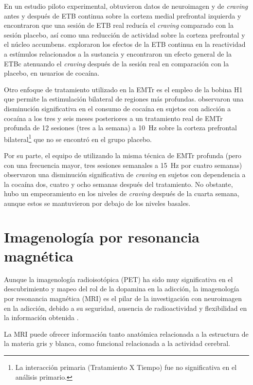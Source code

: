 En un estudio piloto experimental, \textcite{Hanlon2015} obtuvieron datos de neuroimagen y de \textit{craving} antes y después de ETB continua sobre la corteza medial prefrontal izquierda y encontraron que una sesión de ETB real reducía el \textit{craving} comparado con la sesión placebo, así como una reducción de actividad sobre la corteza prefrontal y el núcleo accumbens.
\textcite{Kearney-Ramos2018a} exploraron los efectos de la ETB continua en la reactividad a estímulos relacionados a la sustancia y encontraron un efecto general de la ETBc atenuando el \textit{craving} después de la sesión real en comparación con la placebo, en usuarios de cocaína. \par
Otro enfoque de tratamiento utilizado en la EMTr es el empleo de la bobina H1 que permite la estimulación bilateral de regiones más profundas.
\textcite{Bolloni2016} observaron una disminución significativa en el consumo de cocaína en sujetos con adicción a cocaína a los tres y seis meses posteriores a un tratamiento real de EMTr profunda de 12 sesiones (tres a la semana) a \SI{10}{\hertz} sobre la corteza prefrontal bilateral\footnote{La interacción primaria (Tratamiento X Tiempo) fue no significativa en el análisis primario.} que no se encontró en el grupo placebo.\par
Por su parte, el equipo de \textcite{Rapinesi2016} utilizando la misma técnica de EMTr profunda (pero con una frecuencia mayor, tres sesiones semanales a \SI{15}{\hertz} por cuatro semanas) observaron una disminución significativa de \textit{craving} en sujetos con dependencia a la cocaína dos, cuatro y ocho semanas después del tratamiento.
No obstante, hubo un empeoramiento en los niveles de \textit{craving} después de la cuarta semana, aunque estos se mantuvieron por debajo de los niveles basales.

\section{Imagenología por resonancia magnética}
Aunque la imagenología radioisotópica (PET) ha sido muy significativa en el descubrimiento y mapeo del rol de la dopamina en la adicción, la imagenología por resonancia magnética (MRI) es el pilar de la investigación con neuroimagen en la adicción, debido a su seguridad, ausencia de radioactividad y flexibilidad en la información obtenida \parencite{Suckling2017}. \par
La MRI puede ofrecer información tanto anatómica \textemdash{}relacionada a la estructura de la materia gris y blanca, como funcional \textemdash{}relacionada a la actividad cerebral.

